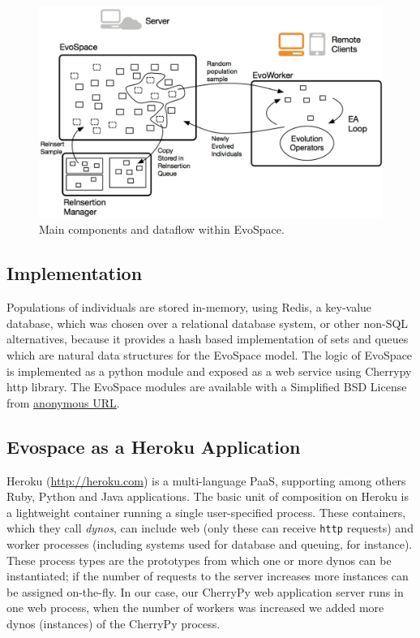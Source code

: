 \documentclass{llncs}
\begin{document}
\begin{figure}[t]
    \centering
        \includegraphics[width=4.5in]{eps/evospaceExample.eps}
    \caption{Main components and dataflow within EvoSpace.}
    \label{fig:evo}
\end{figure}


\subsection{Implementation}
Populations of individuals are stored in-memory, using Redis, a
key-value database, which 
 was chosen over a relational database system, or other non-SQL 
alternatives, because it provides a hash based implementation of sets 
and queues which are natural data structures for the EvoSpace model. 
The logic of EvoSpace is implemented as a python module and exposed as a web 
service using Cherrypy http library. The EvoSpace modules are available with 
a Simplified BSD License from 
\url{anonymous URL}.

\subsection{Evospace as a Heroku Application}

Heroku (\url{http://heroku.com}) is a multi-language PaaS, supporting among others
Ruby, Python and Java applications. The basic unit of composition on
Heroku is a lightweight container running a single user-specified
process. These containers, which they call {\em dynos}, can include web
(only these can receive {\tt http} requests) and worker processes
(including systems used for database and queuing, for instance).
These  process types are the prototypes from which one or more dynos 
can be instantiated; if the number of requests to the server increases
more instances can be assigned on-the-fly. In our case, our CherryPy 
web application server runs in one web process, when the number 
of workers was increased we added more dynos (instances) of the 
CherryPy process.
\end{document}

